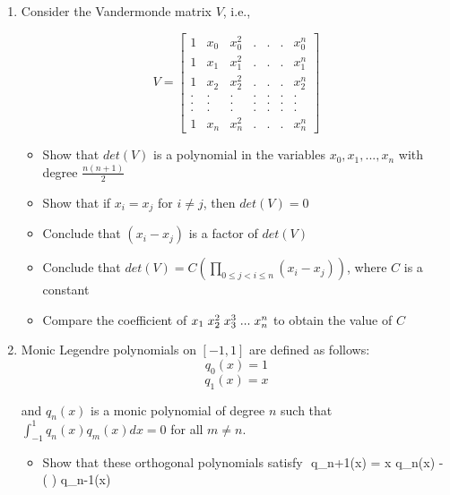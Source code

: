\documentclass{article}
\begin{document}
\begin{enumerate}
\item Consider the Vandermonde matrix $V$, i.e.,

    $$ V = 
    \begin{bmatrix}
        1 & x_{0} & x_{0}^{2} & . & . & . & x_{0}^{n}\\
        1 & x_{1} & x_{1}^{2} & . & . & . & x_{1}^{n}\\
        1 & x_{2} & x_{2}^{2} & . & . & . & x_{2}^{n}\\
        . & .     & .         & . & . & . & . \\
        . & .     & .         & . & . & . & . \\
        . & .     & .         & . & . & . & . \\
        1 & x_{n} & x_{n}^{2} & . & . & . & x_{n}^{n} 
    \end{bmatrix}
    $$



\begin{itemize}  
\item Show that $det(V)$ is a polynomial in the variables $x_{0}, x_{1}, ..., x_{n}$ with degree $\frac{n(n+1)}{2}$
\item Show that if $x_{i} = x_{j}$ for $i \neq j$, then $det(V) = 0$
\item Conclude that $(x_{i} - x_{j})$ is a factor of $det(V)$
\item Conclude that $det(V) = C \left(\displaystyle \prod_{0 \leq j < i \leq n} (x_{i} - x_{j}) \right)$, where $C$ is a constant
\item Compare the coefficient of $x_{1} \hspace{1mm} x_{2}^{2} \hspace{1mm} x_{3}^{3} \hspace{1mm} ... \hspace{1mm} x_{n}^{n}$ to obtain the value of $C$
\end{itemize}

\item Monic Legendre polynomials on $[-1, 1]$ are defined as follows:
    $$ q_{0}(x) = 1 $$
    $$ q_{1}(x) = x $$

and $q_{n}(x)$ is a monic polynomial of degree $n$ such that $\displaystyle \int_{-1}^{1} q_{n}(x) q_{m}(x) dx = 0 $ for all $m \neq n$.

\begin{itemize}
\item Show that these orthogonal polynomials satisfy
    $$ q_{n+1}(x) = x q_{n}(x) - \left( \right) q_{n-1}(x)


\end{itemize}
\end{enumerate}
\end{document}
